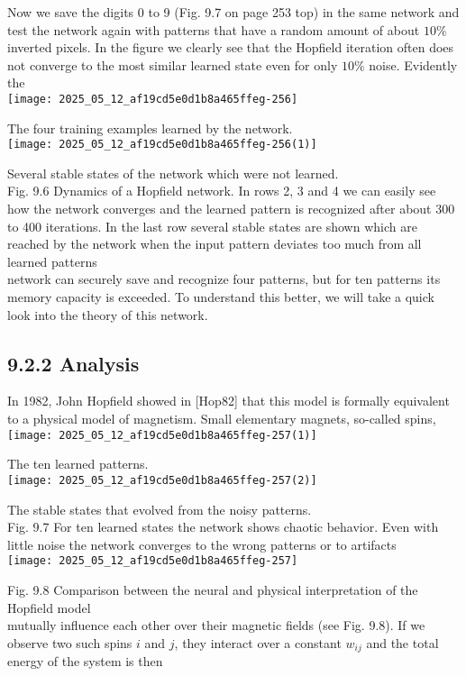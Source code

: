 \documentclass[10pt]{article}
\begin{document}
Now we save the digits 0 to 9 (Fig. 9.7 on page 253 top) in the same network and test the network again with patterns that have a random amount of about $10 \%$ inverted pixels. In the figure we clearly see that the Hopfield iteration often does not converge to the most similar learned state even for only $10 \%$ noise. Evidently the\\
\texttt{[image: 2025\_05\_12\_af19cd5e0d1b8a465ffeg-256]}

The four training examples learned by the network.\\
\texttt{[image: 2025\_05\_12\_af19cd5e0d1b8a465ffeg-256(1)]}

Several stable states of the network which were not learned.\\
Fig. 9.6 Dynamics of a Hopfield network. In rows 2, 3 and 4 we can easily see how the network converges and the learned pattern is recognized after about 300 to 400 iterations. In the last row several stable states are shown which are reached by the network when the input pattern deviates too much from all learned patterns\\
network can securely save and recognize four patterns, but for ten patterns its memory capacity is exceeded. To understand this better, we will take a quick look into the theory of this network.

\subsection*{9.2.2 Analysis}
In 1982, John Hopfield showed in [Hop82] that this model is formally equivalent to a physical model of magnetism. Small elementary magnets, so-called spins,\\
\texttt{[image: 2025\_05\_12\_af19cd5e0d1b8a465ffeg-257(1)]}

The ten learned patterns.\\
\texttt{[image: 2025\_05\_12\_af19cd5e0d1b8a465ffeg-257(2)]}

The stable states that evolved from the noisy patterns.\\
Fig. 9.7 For ten learned states the network shows chaotic behavior. Even with little noise the network converges to the wrong patterns or to artifacts\\
\texttt{[image: 2025\_05\_12\_af19cd5e0d1b8a465ffeg-257]}

Fig. 9.8 Comparison between the neural and physical interpretation of the Hopfield model\\
mutually influence each other over their magnetic fields (see Fig. 9.8). If we observe two such spins $i$ and $j$, they interact over a constant $w_{i j}$ and the total energy of the system is then
\end{document}
